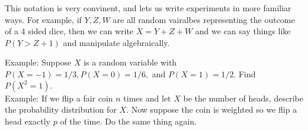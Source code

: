 \documentclass[14,fleqn]{article}
\begin{document}
This notation is very convinent, and lets us write experiments in more familiar ways. For example, if $Y,Z,W$ are all random vairalbes representing the outcome of a 4 sided dice, then we can write $X=Y+Z+W$ and we can say things like $P(Y>Z+1)$ and manipulate algebraically. 

Example: Suppose $X$ is a random variable with $P(X=-1)=1/3, P(X=0)=1/6,$ and $P(X=1)=1/2.$ Find $P(X^2=1).$\\

Example: If we flip a fair coin $n$ times and let $X$ be the number of heads, describe the probability distribution for $X.$ Now suppose the coin is weighted so we flip a head exactly $p$ of the time. Do the same thing again.
	
\end{document}

